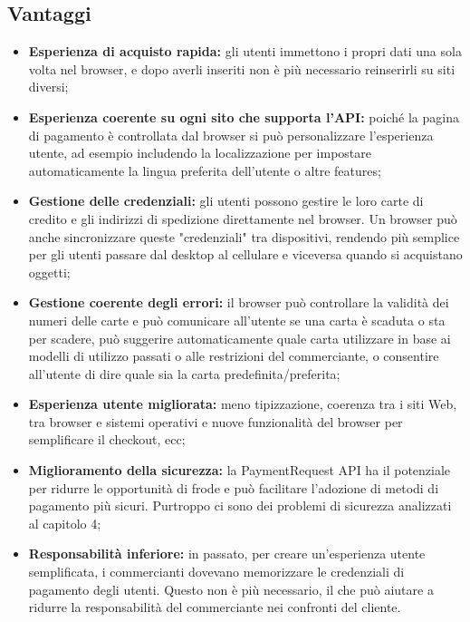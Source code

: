 \documentclass[11pt ,a4paper , twoside , openright ]{article}
\begin{document}
	\subsection{Vantaggi}
	\begin{itemize}
	\item \textbf{Esperienza di acquisto rapida:} gli utenti immettono i propri dati una sola volta nel browser, e dopo averli inseriti non è più necessario reinserirli su siti diversi;
	\item \textbf{Esperienza coerente su ogni sito che supporta l'API:} poiché la pagina di pagamento è controllata dal browser si può personalizzare l'esperienza utente, ad esempio includendo la localizzazione per impostare automaticamente la lingua preferita dell'utente o altre features;
	\item \textbf{Gestione delle credenziali:} gli utenti possono gestire le loro carte di credito e gli indirizzi di spedizione direttamente nel browser. Un browser può anche sincronizzare queste "credenziali" tra dispositivi, rendendo più semplice per gli utenti passare dal desktop al cellulare e viceversa quando si acquistano oggetti;
	\item \textbf{Gestione coerente degli errori:} il browser può controllare la validità dei numeri delle carte e può comunicare all'utente se una carta è scaduta o sta per scadere, può suggerire automaticamente quale carta utilizzare in base ai modelli di utilizzo passati o alle restrizioni del commerciante, o consentire all'utente di dire quale sia la carta predefinita/preferita;
	\item \textbf{Esperienza utente migliorata:} meno tipizzazione, coerenza tra i siti Web, tra browser e sistemi operativi e nuove funzionalità del browser per semplificare il checkout, ecc;
	\item \textbf{Miglioramento della sicurezza:} la PaymentRequest API ha il potenziale per ridurre le opportunità di frode e può facilitare l'adozione di metodi di pagamento più sicuri. Purtroppo ci sono dei problemi di sicurezza analizzati al capitolo 4; 
	\item \textbf{Responsabilità inferiore:} in passato, per creare un'esperienza utente semplificata, i commercianti dovevano memorizzare le credenziali di pagamento degli utenti. Questo non è più necessario, il che può aiutare a ridurre la responsabilità del commerciante nei confronti del cliente.
	\end{itemize}
	
\end{document}
